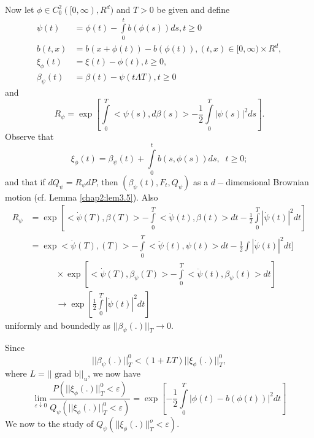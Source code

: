 Now let $\phi \in C^2_0([0, \infty), R^d)$ and $T > 0$ be given and
  define  
\begin{align*}
\psi(t) & = \phi(t) - \int\limits_{0}^t b(\phi(s)) ds, t \ge 0
\tag{5.5}\label{chap2:eq5.5}\\ 
b(t,x) & = b(x + \phi(t))-b (\phi(t)), (t,x) \in [0, \infty) \times
  R^d , \tag{5.6}\label{chap2:eq5.6}\\ 
\xi_\phi(t) &= \xi(t)- \phi(t), t \ge 0, \tag{5.7}\label{chap2:eq5.7}\\ 
\beta_\psi(t) &= \beta(t)- \psi(t \Lambda T), t \ge 0
\tag{5.8}\label{chap2:eq5.8}  
\end{align*}\pageoriginale
and 
\begin{equation*}
R_\psi= \exp [\int\limits_{0}^T < \psi(s), d \beta(s) > - \frac{1}{2}
  \int\limits_{0}^T | \psi(s)|^2 ds]. \tag{5.9}\label{chap2:eq5.9} 
\end{equation*}
Observe that 
\begin{equation*}
\xi_\phi(t)= \beta_\psi(t) + \int\limits_{0}^t b(s, \phi(s)) ds, \;\; t \ge 
0; \tag{5.10}\label{chap2:eq5.10} 
\end{equation*}
and that if $d Q_\psi= R_\psi dP$, then  $(\beta_\psi(t), F_t,
Q_\psi)$ as a $d-$dimensional Brownian motion (cf. Lemma
\ref{chap2:lem3.5}). Also  
\begin{align*}
R_\psi &= \exp [< \dot{\psi}(T),\beta(T) >- \int\limits_{0}^T <
  \ddot{\psi}(t), \beta(t) >dt - \frac{1}{2} \int\limits_{0}^T
  |\dot{\psi}(t) |^2 dt]\\ 
&= \exp < \dot{\psi}(T),(T) >- \int\limits_{0}^T < \ddot{\psi}(t),
\psi(t) > dt - \frac{1}{2} \int |\dot{\psi}(t) |^2 dt]\\ 
& \qquad \quad \times \exp [< \dot{\psi}(T), \beta_\psi(T) >-
  \int\limits_{0}^T < \ddot{\psi} (t), \beta_\psi(t) > dt ]\\ 
&\qquad \quad \to \exp [\frac{1}{2} \int\limits_{0}^T |\dot{\psi}(t)
  |^2 dt ] 
\end{align*}
uniformly and boundedly as $|| \beta_\psi(.) ||_T \to 0$. 

\noindent
Since
$$
|| \beta_\psi(.) ||^0_T < (1 + LT) || \xi_\phi(.) ||^0_T, 
$$
where $L = || \text{ grad b} ||_u$, we now have 
$$
\lim_{\varepsilon \downarrow 0} \frac{P( || \xi_\phi(.) ||^0_T <
  \varepsilon )}{Q_\psi ( || \xi_\phi(.) ||^0_T < \varepsilon )} =
\exp [- \frac{1}{2} \int\limits_{0}^T | \phi(t) - b(\phi(t))|^2 dt] 
$$\pageoriginale
We now to the study of $Q_\psi(|| \xi_\phi(.) ||^o_T < \varepsilon
)$. 

